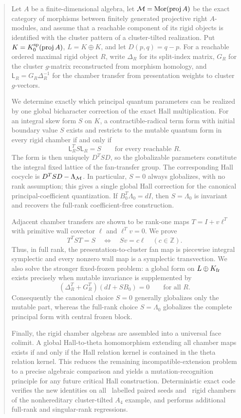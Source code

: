 \begin{abstract}
Let $A$ be a finite-dimensional algebra, let
$\MM=\Mor(\proj A)$ be the exact category of morphisms between finitely
generated projective right $A$-modules, and assume that a reachable component
of its rigid objects is identified with the cluster pattern of a
cluster-tilted realization.  Put $K=K_0^{\rm sp}(\proj A)$,
$L=K\oplus K$, and let $D(p,q)=q-p$.  For a reachable ordered maximal rigid
object $R$, write $\Delta_R$ for its split-index matrix, $G_R$ for the cluster
$g$-matrix reconstructed from morphism homology, and
$\mathsf L_R=G_R\Delta_R^{-1}$ for the chamber transfer from presentation
weights to cluster $g$-vectors.

We determine exactly which principal quantum parameters can be realized by
one global bicharacter correction of the exact Hall multiplication.  For an
integral skew form $S$ on $K$, a contractible-radical term form with initial
boundary value $S$ exists and restricts to the mutable quantum form in every
rigid chamber if and only if
\[
 \mathsf L_R^TS\mathsf L_R=S
 \qquad\text{for every reachable }R.
\]
The form is then uniquely $D^TSD$, so the globalizable parameters constitute
the integral fixed lattice of the fan-transfer group.  The corresponding Hall
cocycle is $D^TSD-\Lambda_{\MM}$.  In particular, $S=0$ always globalizes,
with no rank assumption; this gives a single global Hall correction for the
canonical principal-coefficient quantization.  If
$B_0^T\Lambda_0=dI$, then $S=\Lambda_0$ is invariant and recovers the
full-rank coefficient-free construction.

Adjacent chamber transfers are shown to be rank-one maps
$T=I+v\ell^T$ with primitive wall covector $\ell$ and $\ell^Tv=0$.  We prove
\[
 T^TST=S \quad\Longleftrightarrow\quad Sv=c\ell
 \quad(c\in\mathbb Z).
\]
Thus, in full rank, the presentation-to-cluster fan map is piecewise integral
symplectic and every nonzero wall map is a symplectic transvection.  We also
solve the stronger fixed-frozen problem: a global form on
$L\oplus K_{\rm fr}$ exists precisely when mutable invariance is supplemented
by
\[
 (\Delta_R^T+G_R^T)(dI+SB_0)=0
 \qquad\text{for all }R.
\]
Consequently the canonical choice $S=0$ generally globalizes only the mutable
part, whereas the full-rank choice $S=\Lambda_0$ globalizes the complete
principal form with central frozen block.

Finally, the rigid chamber algebras are assembled into a universal face
colimit.  A global Hall-to-theta homomorphism extending all chamber maps exists
if and only if the Hall relation kernel is contained in the theta relation
kernel.  This reduces the remaining incompatible-extension problem to a
precise algebraic comparison and yields a mutation-recognition principle for
any future critical Hall construction.  Deterministic exact code verifies the
new identities on all \AIVLabeledStates\ labelled paired seeds and
\AIVChambers\ rigid chambers of the nonhereditary cluster-tilted $A_4$
example, and performs additional full-rank and singular-rank regressions.
\end{abstract}
